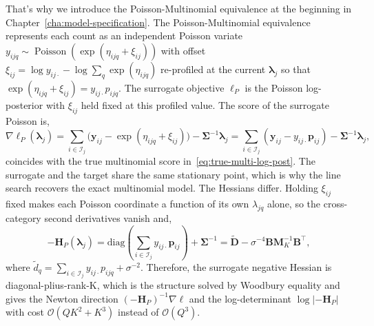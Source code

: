 That’s why we introduce the Poisson-Multinomial equivalence at the beginning in Chapter~\ref{cha:model-specification}. The Poisson-Multinomial equivalence represents each count as an independent Poisson variate $y_{ijq}\sim \operatorname{Poisson}\left(\exp (\eta_{ijq}+\xi_{ij})\right)$ with offset $\xi_{ij}=\log y_{ij\cdot}-\log \sum_{q}\exp(\eta_{ijq})$ re-profiled at the current $\bm{\lambda}_{j}$ so that $\exp(\eta_{ijq}+\xi_{ij})=y_{ij\cdot}p_{ijq}$. The surrogate objective $\ell_{P}$ is the Poisson log-posterior with $\xi_{ij}$ held fixed at this profiled value. The score of the surrogate Poisson is,
\begin{equation}
    \nabla\ell_{P}(\bm{\lambda}_{j})=\sum_{i\in\mathcal{I}_{j}}\bigl(\bm{y}_{ij}-\exp (\eta_{ijq}+\xi_{ij})\bigr)-\bm{\Sigma}^{-1}\bm{\lambda}_{j}=\sum_{i\in\mathcal{I}_{j}}(\bm{y}_{ij}-y_{ij\cdot}\bm{p}_{ij})-\bm{\Sigma}^{-1}\bm{\lambda}_{j},
    \label{eq:poi-log-post}
\end{equation}
coincides with the true multinomial score in~\eqref{eq:true-multi-log-post}. The surrogate and the target share the same stationary point, which is why the line search recovers the exact multinomial model. The Hessians differ. Holding $\xi_{ij}$ fixed makes each Poisson coordinate a function of its own $\lambda_{jq}$ alone, so the cross-category second derivatives vanish and,
\begin{equation}
    -\mathbf{H}_{P}(\bm{\lambda}_{j})=\text{diag}\left(\sum_{i\in\mathcal{I}_{j}}y_{ij\cdot}\bm{p}_{ij}\right)+\bm{\Sigma}^{-1}=\tilde{\mathbf{D}}-\sigma^{-4}\mathbf{BM}_{K}^{-1}\mathbf{B}^{\top},
    \label{eq:poi-hessian}
\end{equation}
where $\tilde{d}_{q}=\sum_{i\in\mathcal{I}_{j}}y_{ij\cdot}p_{ijq}+\sigma^{-2}$. Therefore, the surrogate negative Hessian is diagonal-plius-rank-K, which is the structure solved by Woodbury equality and gives the Newton direction $\left(-\mathbf{H}_{P}\right)^{-1}\nabla\ell$ and the log-determinant $\log |-\mathbf{H}_{P}|$ with cost $\mathcal{O}(QK^{2}+K^{3})$ instead of $\mathcal{O}(Q^{3})$.

